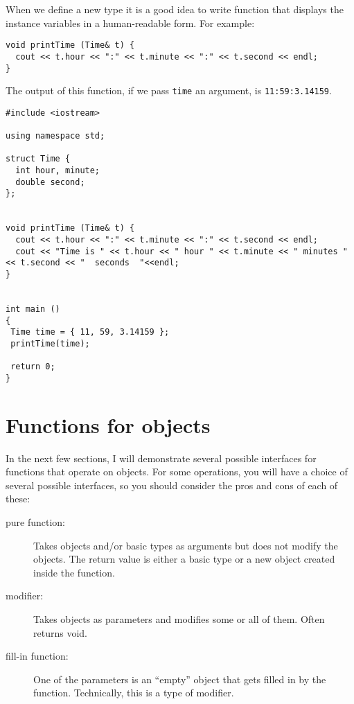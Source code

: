 When we define a new type it is a good idea to write
function that displays the instance variables in a human-readable
form.  For example:

\begin{verbatim}
void printTime (Time& t) {
  cout << t.hour << ":" << t.minute << ":" << t.second << endl;
}
\end{verbatim}
%
The output of this function, if we pass {\tt time}
an argument, is {\tt 11:59:3.14159}.

\begin{verbatim}
#include <iostream>

using namespace std;

struct Time {
  int hour, minute;
  double second;
};


void printTime (Time& t) {
  cout << t.hour << ":" << t.minute << ":" << t.second << endl;
  cout << "Time is " << t.hour << " hour " << t.minute << " minutes " << t.second << "  seconds  "<<endl;
}


int main ()
{
 Time time = { 11, 59, 3.14159 };
 printTime(time);
 
 return 0;
}
\end{verbatim}
%

\section{Functions for objects}
\label{objectops}

In the next few
sections, I will demonstrate several possible interfaces for
functions that operate on objects.  For some operations, you will have a
choice of several possible interfaces, so you should consider the pros
and cons of each of these:

\begin{description}

\item[pure function:]  Takes objects and/or basic types as
arguments but does not modify the objects.  The return value is
either a basic type or a new object created inside the function.

\item[modifier:]  Takes objects as parameters and modifies some
or all of them.  Often returns void. 

\item[fill-in function:]  One of the parameters is an ``empty''
object that gets filled in by the function.  Technically, this is
a type of modifier.

\end{description}

